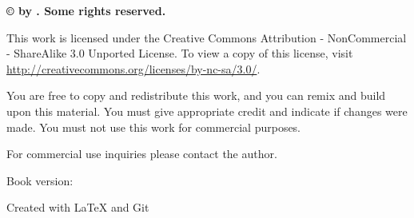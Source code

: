 
\vspace*{\fill}

{\raggedleft

{\Huge \textbf{\textsc{\OPTtitle}}}\par

\medskip

{\Large \textbf{\OPTsubtitle}}\par

\bigskip
\hrulefill
\bigskip

{\Large \textsc{\OPTauthor} }\par

} %
\vspace*{\fill}
\clearpage

\thispagestyle{empty}

\noindent \textbf{\copyright{} \the\year{} by \OPTauthor. Some rights reserved.}

\medskip

\noindent This work is licensed under the Creative Commons Attribution - NonCommercial - ShareAlike 3.0 Unported License. To view a copy of this license, visit 
\url{http://creativecommons.org/licenses/by-nc-sa/3.0/}.

\medskip

You are free to copy and redistribute this work, and you can remix and build upon this material. You must give appropriate credit and indicate if changes were made. You must not use this work for commercial purposes. 

\medskip

For commercial use inquiries please contact the author.

\vfill

Book version: \texttt{}

\bigskip

Created with \LaTeX{} and Git